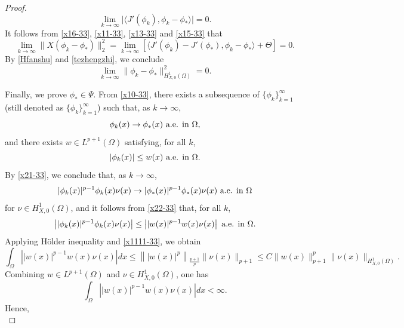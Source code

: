\documentclass[11pt,a4paper]{article}
\numberwithin{equation}{section}
\numberwithin{remark}{section}
\begin{document}
\begin{proof}
\begin{equation}
\lim_{k\rightarrow\infty}\big|\langle J'(\phi_k),\phi_k-\phi_*\rangle\big|=0.
\end{equation}
It follows from \eqref{x16-33}, \eqref{x11-33}, \eqref{x13-33} and \eqref{x15-33} that
\begin{equation*}
\lim_{k\rightarrow\infty}\|X(\phi_k-\phi_*)\|_2^2=\lim_{k\rightarrow\infty}\left[\langle J'(\phi_k)-J'(\phi_*),\phi_k-\phi_*\rangle+\Theta\right]=0.
\end{equation*}
By \eqref{Hfanshu} and \eqref{tezhengzhi}, we conclude
\begin{equation*}
\lim_{k\rightarrow\infty}\|\phi_k-\phi_*\|_{H_{X,0}^1(\Omega)}^2=0.
\end{equation*}

Finally, we prove $\phi_*\in \Psi$. From \eqref{x10-33}, there exists a subsequence of $\{\phi_k\}_{k=1}^\infty$ (still denoted as $\{\phi_k\}_{k=1}^\infty$) such that, as $k\rightarrow\infty$,
\begin{equation}\label{x21-33}
\phi_k(x)\rightarrow \phi_*(x) \hbox{ a.e. in } \Omega,
\end{equation}
and there exists $w\in L^{p+1}(\Omega)$ satisfying, for all $k$,
\begin{equation}\label{x22-33}
|\phi_k(x)|\leq w(x) \hbox{ a.e. in } \Omega.
\end{equation}
By \eqref{x21-33}, we conclude that, as $k\rightarrow\infty$,
\begin{equation}\label{x24-33}
|\phi_k(x)|^{p-1}\phi_k(x)\nu(x)\rightarrow |\phi_*(x)|^{p-1}\phi_*(x)\nu(x) \hbox{ a.e. in } \Omega
\end{equation}
for $\nu\in H_{X,0}^1(\Omega)$, and it follows from \eqref{x22-33} that, for all $k$,
\begin{equation}\label{x25-33}
\left||\phi_k(x)|^{p-1}\phi_k(x)\nu(x)\right|\leq \left||w(x)|^{p-1}w(x)\nu(x)\right| \hbox{ a.e. in } \Omega.
\end{equation}
Applying H\"{o}lder inequality and \eqref{x1111-33}, we obtain
\begin{equation*}
\int_\Omega\left||w(x)|^{p-1}w(x)\nu(x)\right|dx\leq\left\||w(x)|^p\right\|_{\frac{p+1}{p}}\|\nu(x)\|_{p+1}\leq C\|w(x)\|_{p+1}^p\|\nu(x)\|_{H_{X,0}^1(\Omega)}.
\end{equation*}
Combining $w\in L^{p+1}(\Omega)$ and $\nu\in H_{X,0}^1(\Omega)$, one has
\begin{equation*}
\int_\Omega\left||w(x)|^{p-1}w(x)\nu(x)\right|dx<\infty.
\end{equation*}
Hence,
\begin{equation}\label{vvv}

\end{equation}
\end{proof}
\end{document}

